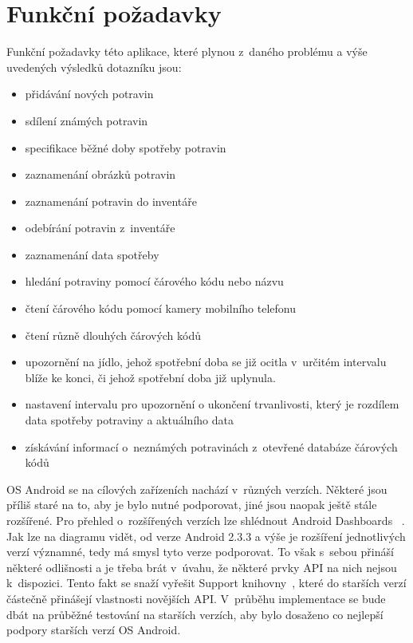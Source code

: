 \documentclass[thesis=B,czech]{FITthesis}[2013/10/20]
\begin{document}
\section{Funkční požadavky}

Funkční požadavky této aplikace, které plynou z~daného problému a výše uvedených výsledků dotazníku jsou:
\begin{itemize}
  \item přidávání nových potravin
  \item sdílení známých potravin
  \item specifikace běžné doby spotřeby potravin
  \item zaznamenání obrázků potravin
  \item zaznamenání potravin do inventáře
  \item odebírání potravin z~inventáře
  \item zaznamenání data spotřeby
  \item hledání potraviny pomocí čárového kódu nebo názvu
  \item čtení čárového kódu pomocí kamery mobilního telefonu
  \item čtení různě dlouhých čárových kódů
  \item upozornění na jídlo, jehož spotřební doba se již ocitla v~určitém intervalu blíže ke konci, či jehož spotřební doba již uplynula.
  \item nastavení intervalu pro upozornění o ukončení trvanlivosti, který je rozdílem data spotřeby potraviny a aktuálního data
  \item získávání informací o~neznámých potravinách z~otevřené databáze čárových kódů
\end{itemize}

OS Android se na cílových zařízeních nachází v~různých verzích. Některé jsou příliš staré na to, aby je bylo nutné podporovat, jiné jsou naopak ještě stále rozšířené. Pro přehled o~rozšířených verzích lze shlédnout Android Dashboards ~\cite{dashboards}. Jak lze na diagramu vidět, od verze Android 2.3.3 a výše je rozšíření jednotlivých verzí významné, tedy má smysl tyto verze podporovat. To však s~sebou přináší některé odlišnosti a je třeba brát v~úvahu, že některé prvky API na nich nejsou k~dispozici. Tento fakt se snaží vyřešit Support knihovny~\cite{support}, které do starších verzí částečně přinášejí vlastnosti novějších API. V~průběhu implementace se bude dbát na průběžné testování na starších verzích, aby bylo dosaženo co nejlepší podpory starších verzí OS Android.
\end{document}

